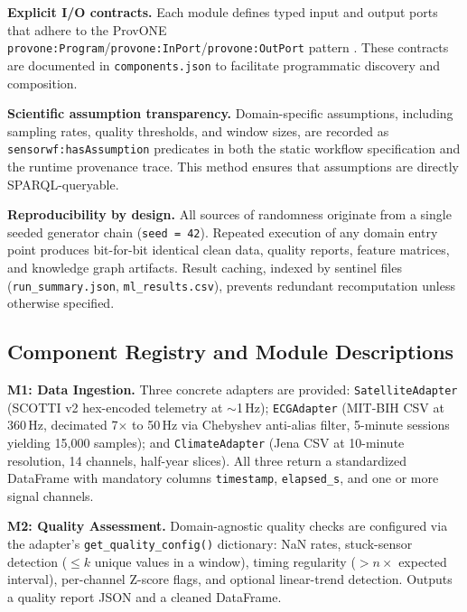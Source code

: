 \documentclass[conference]{IEEEtran}
\begin{document}
\textbf{Explicit I/O contracts.} Each module defines typed input and output ports that adhere to the ProvONE \texttt{provone:Program}/\texttt{provone:InPort}/\texttt{provone:OutPort} pattern \cite{missier2013provone}. These contracts are documented in \texttt{components.json} to facilitate programmatic discovery and composition.

\textbf{Scientific assumption transparency.} Domain-specific assumptions, including sampling rates, quality thresholds, and window sizes, are recorded as \texttt{sensorwf:hasAssumption} predicates in both the static workflow specification and the runtime provenance trace. This method ensures that assumptions are directly SPARQL-queryable.

\textbf{Reproducibility by design.} All sources of randomness originate from a single seeded generator chain (\texttt{seed = 42}). Repeated execution of any domain entry point produces bit-for-bit identical clean data, quality reports, feature matrices, and knowledge graph artifacts. Result caching, indexed by sentinel files (\texttt{run\_summary.json}, \texttt{ml\_results.csv}), prevents redundant recomputation unless otherwise specified.

\subsection{Component Registry and Module Descriptions}

\textbf{M1: Data Ingestion.} Three concrete adapters are provided: \texttt{SatelliteAdapter} (SCOTTI v2 hex-encoded telemetry at $\sim$1\,Hz); \texttt{ECGAdapter} (MIT-BIH CSV at 360\,Hz, decimated 7$\times$ to 50\,Hz via Chebyshev anti-alias filter, 5-minute sessions yielding 15,000 samples); and \texttt{ClimateAdapter} (Jena CSV at 10-minute resolution, 14 channels, half-year slices). All three return a standardized DataFrame with mandatory columns \texttt{timestamp}, \texttt{elapsed\_s}, and one or more signal channels.

\textbf{M2: Quality Assessment.} Domain-agnostic quality checks are configured via the adapter's \texttt{get\_quality\_config()} dictionary: NaN rates, stuck-sensor detection ($\le k$ unique values in a window), timing regularity ($> n\times$ expected interval), per-channel Z-score flags, and optional linear-trend detection. Outputs a quality report JSON and a cleaned DataFrame.
\end{document}
